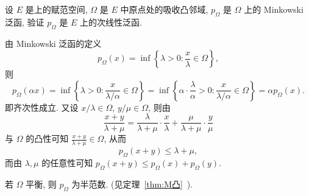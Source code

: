 	\begin{example}
		设 $ E $ 是\R 上的赋范空间, $ \varOmega $ 是 $ E $ 中原点处的吸收凸邻域, $ p_{\varOmega} $ 是 $ \varOmega $ 上的 Minkowski 泛函, 验证 $ p_{\varOmega} $ 是 $ E $ 上的次线性泛函.
	\end{example}
	\begin{answer}
		由 Minkowski 泛函的定义
		\[
			p_{\varOmega}(x)=\inf\left\{ \lambda>0: \frac{x}{\lambda}\in\varOmega \right\},
		\]
		则
		\[
			p_{\varOmega}(\alpha x)=\inf\left\{ \lambda>0: \frac{x}{\lambda/\alpha}\in\varOmega \right\} = \inf\left\{ \alpha\cdot\frac{\lambda}{\alpha}>0:\frac{x}{\lambda/\alpha}\in\varOmega \right\}=\alpha p_{\varOmega}(x).
		\]
		即齐次性成立. 又设 $ x/\lambda\in\varOmega $, $ y/\mu\in\varOmega $, 则由
		\[
			\frac{x+y}{\lambda+\mu}=\frac{\lambda}{\lambda+\mu}\cdot\frac{x}{\lambda}+\frac{\mu}{\lambda+\mu}\cdot\frac{y}{\mu}
		\]
		与 $ \varOmega $ 的凸性可知 $ \frac{x+y}{\lambda+\mu}\in\varOmega $, 从而
		\[
			p_{\varOmega}(x+y)\leqslant \lambda+\mu,
		\]
		而由 $ \lambda, \mu $ 的任意性可知 $ p_{\varOmega}(x+y)\leqslant p_{\varOmega}(x)+p_{\varOmega}(y) $.\qedhere
	\end{answer}
	\begin{remark}
		若 $ \varOmega $ 平衡, 则 $ p_{\varOmega} $ 为半范数. (见定理~\ref{thm:M凸}~).
	\end{remark}
	
